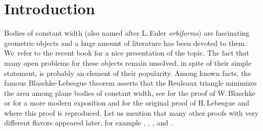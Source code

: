 \section{Introduction}

Bodies of constant width (also named after L.\,Euler \emph{orbiforms}) are fascinating geometric
objects and a huge amount of literature has been devoted to them. We~refer to the recent book
\cite{MMO} for a nice presentation of the topic. The fact that many open problems for these objects
remain unsolved, in spite of their simple statement, is probably an element of their popularity.
Among known facts, the famous Blaschke-Lebesgue theorem asserts that the Reuleaux triangle
minimizes the area among plane bodies of constant width, see \cite{Bla} for the proof of W.\,Blaschke or \cite{KM} for a more modern exposition and \cite{Le} for the original proof of H.\,Lebesgue
and \cite{BF} where this proof is reproduced. Let us mention that many
other proofs with very different flavors appeared later, for example \cite{Be}, \cite{CCG},
\cite{Eg}, \cite{Ga} and \cite{Ha}.

